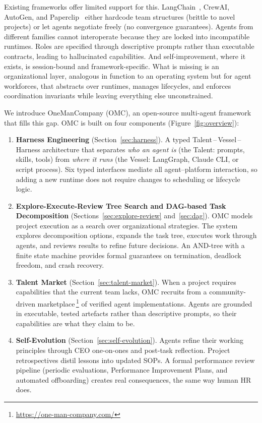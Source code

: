 \documentclass[11pt,a4paper]{article}
\begin{document}
Existing frameworks offer limited support for this.  LangChain~\cite{langchain2024deepagents}, CrewAI, AutoGen, and Paperclip~\cite{paperclip2025} either hardcode team structures (brittle to novel projects) or let agents negotiate freely (no convergence guarantees).  Agents from different families cannot interoperate because they are locked into incompatible runtimes.  Roles are specified through descriptive prompts rather than executable contracts, leading to hallucinated capabilities.  And self-improvement, where it exists, is session-bound and framework-specific.  What is missing is an organizational layer, analogous in function to an operating system but for agent workforces, that abstracts over runtimes, manages lifecycles, and enforces coordination invariants while leaving everything else unconstrained.

We introduce OneManCompany (OMC), an open-source multi-agent framework that fills this gap.  OMC is built on four components (Figure~\ref{fig:overview}):

\begin{enumerate}[nosep]
\item \textbf{Harness Engineering} (Section~\ref{sec:harness}).  A typed Talent\,--\,Vessel\,--\,Harness architecture that separates \emph{who an agent is} (the Talent: prompts, skills, tools) from \emph{where it runs} (the Vessel: LangGraph, Claude CLI, or script process).  Six typed interfaces mediate all agent--platform interaction, so adding a new runtime does not require changes to scheduling or lifecycle logic.

\item \textbf{Explore-Execute-Review Tree Search and DAG-based Task Decomposition} (Sections~\ref{sec:explore-review} and~\ref{sec:dag}).  OMC models project execution as a search over organizational strategies.  The system explores decomposition options, expands the task tree, executes work through agents, and reviews results to refine future decisions.  An AND-tree with a finite state machine provides formal guarantees on termination, deadlock freedom, and crash recovery.

\item \textbf{Talent Market} (Section~\ref{sec:talent-market}).  When a project requires capabilities that the current team lacks, OMC recruits from a community-driven marketplace\,\footnote{\url{https://one-man-company.com/}} of verified agent implementations.  Agents are grounded in executable, tested artefacts rather than descriptive prompts, so their capabilities are what they claim to be.

\item \textbf{Self-Evolution} (Section~\ref{sec:self-evolution}).  Agents refine their working principles through CEO one-on-ones and post-task reflection.  Project retrospectives distil lessons into updated SOPs.  A formal performance review pipeline (periodic evaluations, Performance Improvement Plans, and automated offboarding) creates real consequences, the same way human HR does.
\end{enumerate}
\end{document}
